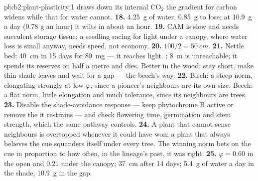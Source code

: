 \begin{solution}{pb:b2:plant-plasticity:1}
draws down its internal $\mathrm{CO_2}$ the gradient for carbon
widens while that for water cannot.
\textbf{18.} \qty{4.25}{g} of water, \qty{0.85}{g} to lose; at
\qty{10.9}{g} a day ($0.78$ g an hour) it wilts in about an hour.
\textbf{19.} CAM is slow and needs succulent storage tissue; a
seedling racing for light under a canopy, where water loss is small
anyway, needs speed, not economy.
\textbf{20.} $100/2 = \qty{50}{cm}$.
\textbf{21.} Nettle bed: \qty{40}{cm} in 15 days for \qty{80}{mg} ---
it reaches light. : \qty{8}{m} is unreachable; it spends its
reserves on half a metre and dies. Better in the wood: stay short,
make thin shade leaves and wait for a gap --- the beech's way.
\textbf{22.} Birch: a steep norm, elongating strongly at low
$\varphi$, since a pioneer's neighbours are its own size. Beech: a
flat norm, little elongation and much tolerance, since its neighbours
are trees.
\textbf{23.} Disable the shade-avoidance response --- keep
phytochrome B active or remove the  it
restrains --- and check flowering time, germination and stem
strength, which the same pathway controls.
\textbf{24.} A plant that cannot sense neighbours is overtopped
whenever it could have won; a plant that always believes the cue
squanders itself under every tree. The winning norm bets on the
cue in proportion to how often, in the lineage's past, it was
right.
\textbf{25.} $\varphi = 0.60$ in the open and $0.21$ under the canopy;
\qty{37}{cm} after 14 days; \qty{5.4}{g} of water a day in the shade,
\qty{10.9}{g} in the gap.
\end{solution}
